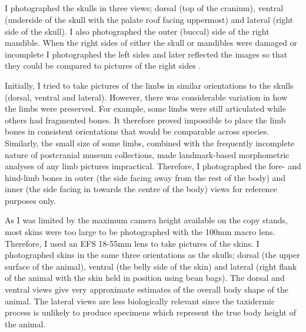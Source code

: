 \subsection{}
	I photographed the skulls in three views; dorsal (top of the cranium), ventral (underside of the skull with the palate roof facing uppermost) and lateral (right side of the skull). I also photographed the outer (buccal) side of the right mandible. When the right sides of either the skull or mandibles were damaged or incomplete I photographed the left sides and later reflected the images so that they could be compared to pictures of the right sides \citep[e.g.][]{Barrow2008}.

	Initially, I tried to take pictures of the limbs in similar orientations to the skulls (dorsal, ventral and lateral). However, there was considerable variation in how the limbs were preserved. For example, some limbs were still articulated while others had fragmented bones. It therefore proved impossible to place the limb bones in consistent orientations that would be comparable across species. Similarly, the small size of some limbs, combined with the frequently incomplete nature of postcranial museum collections, made landmark-based morphometric analyses of any limb pictures impractical. Therefore, I photographed the fore- and hind-limb bones in outer (the side facing away from the rest of the body) and inner (the side facing in towards the centre of the body) views for reference purposes only.

	As I was limited by the maximum camera height available on the copy stands, most skins were too large to be photographed with the 100mm macro lens. Therefore, I used an EFS 18-55mm lens to take pictures of the skins. I photographed skins in the same three orientations as the skulls; dorsal (the upper surface of the animal), ventral (the belly side of the skin) and lateral (right flank of the animal with the skin held in position using bean bags). The dorsal and ventral views give very approximate estimates of the overall body shape of the animal. The lateral views are less biologically relevant since the taxidermic process is unlikely to produce specimens which represent the true body height of the animal.


